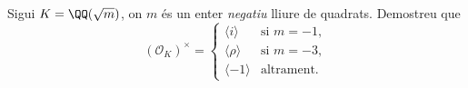 \documentclass[11pt, a4paper]{article}
\begin{document}
    \newpage
    \begin{tcolorbox}[title=\section{FP 4 Exercici 2}]
        Sigui $K=\QQ(\sqrt{m})$, on $m$ és un enter \emph{negatiu} lliure de quadrats. Demostreu que
        \[
            (\mathcal{O}_K)^\times=\begin{cases}
                \langle i \rangle&\text{si } m=-1,\\
                \langle \rho \rangle&\text{si } m=-3,\\
                \langle -1 \rangle&\text{altrament.}
            \end{cases}
        \]
    \end{tcolorbox}
\end{document}
